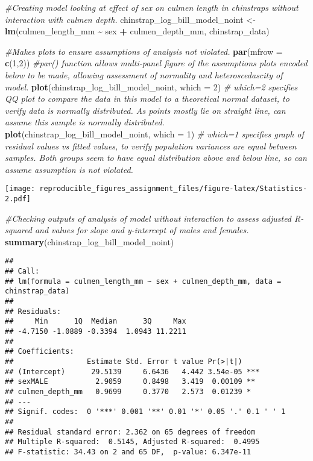 \documentclass[
]{article}
\newenvironment{Shaded}{\begin{snugshade}}{\end{snugshade}}
\newcommand{\AttributeTok}[1]{\textcolor[rgb]{0.13,0.29,0.53}{#1}}
\newcommand{\CommentTok}[1]{\textcolor[rgb]{0.56,0.35,0.01}{\textit{#1}}}
\newcommand{\DecValTok}[1]{\textcolor[rgb]{0.00,0.00,0.81}{#1}}
\newcommand{\FunctionTok}[1]{\textcolor[rgb]{0.13,0.29,0.53}{\textbf{#1}}}
\newcommand{\NormalTok}[1]{#1}
\newcommand{\OtherTok}[1]{\textcolor[rgb]{0.56,0.35,0.01}{#1}}
\newcommand{\SpecialCharTok}[1]{\textcolor[rgb]{0.81,0.36,0.00}{\textbf{#1}}}
\begin{document}
\begin{Shaded}
\begin{Highlighting}[]
\CommentTok{\#Creating model looking at effect of sex on culmen length in chinstraps without interaction with culmen depth.}
\NormalTok{chinstrap\_log\_bill\_model\_noint }\OtherTok{\textless{}{-}} \FunctionTok{lm}\NormalTok{(culmen\_length\_mm }\SpecialCharTok{\textasciitilde{}}\NormalTok{ sex }\SpecialCharTok{+}\NormalTok{ culmen\_depth\_mm, chinstrap\_data)}

\CommentTok{\#Makes plots to ensure assumptions of analysis not violated.}
\FunctionTok{par}\NormalTok{(}\AttributeTok{mfrow =} \FunctionTok{c}\NormalTok{(}\DecValTok{1}\NormalTok{,}\DecValTok{2}\NormalTok{)) }\CommentTok{\#par() function allows multi{-}panel figure of the assumptions plots encoded below to be made, allowing assessment of normality and heteroscedascity of model.}
\FunctionTok{plot}\NormalTok{(chinstrap\_log\_bill\_model\_noint, }\AttributeTok{which =} \DecValTok{2}\NormalTok{) }\CommentTok{\# which=2 specifies QQ plot to compare the data in this model to a theoretical normal dataset, to verify data is normally distributed. As points mostly lie on straight line, can assume this sample is normally distributed.}
\FunctionTok{plot}\NormalTok{(chinstrap\_log\_bill\_model\_noint, }\AttributeTok{which =} \DecValTok{1}\NormalTok{) }\CommentTok{\# which=1 specifies graph of residual values vs fitted values, to verify population variances are equal between samples. Both groups seem to have equal distribution above and below line, so can assume assumption is not violated.}
\end{Highlighting}
\end{Shaded}

\texttt{[image: reproducible\_figures\_assignment\_files/figure-latex/Statistics-2.pdf]}

\begin{Shaded}
\begin{Highlighting}[]
\CommentTok{\#Checking outputs of analysis of model without interaction to assess adjusted R{-}squared and values for slope and y{-}intercept of males and females.}
\FunctionTok{summary}\NormalTok{(chinstrap\_log\_bill\_model\_noint)}
\end{Highlighting}
\end{Shaded}

\begin{verbatim}
## 
## Call:
## lm(formula = culmen_length_mm ~ sex + culmen_depth_mm, data = chinstrap_data)
## 
## Residuals:
##     Min      1Q  Median      3Q     Max 
## -4.7150 -1.0889 -0.3394  1.0943 11.2211 
## 
## Coefficients:
##                 Estimate Std. Error t value Pr(>|t|)    
## (Intercept)      29.5139     6.6436   4.442 3.54e-05 ***
## sexMALE           2.9059     0.8498   3.419  0.00109 ** 
## culmen_depth_mm   0.9699     0.3770   2.573  0.01239 *  
## ---
## Signif. codes:  0 '***' 0.001 '**' 0.01 '*' 0.05 '.' 0.1 ' ' 1
## 
## Residual standard error: 2.362 on 65 degrees of freedom
## Multiple R-squared:  0.5145, Adjusted R-squared:  0.4995 
## F-statistic: 34.43 on 2 and 65 DF,  p-value: 6.347e-11
\end{verbatim}
\end{document}
